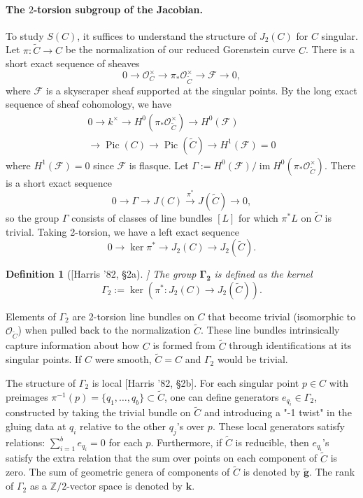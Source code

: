 \documentclass[11pt,a4paper]{article}
\newcommand{\OhC}{\mathcal{O}_C}
\newcommand{\OhCtilde}{\mathcal{O}_{\widetilde{C}}}
\newcommand{\Pic}{\operatorname{Pic}}
\newcommand{\ZZ}{\mathbb{Z}}
\theoremstyle{mytheoremstyle}
\theoremstyle{mydefinitionstyle}
\newtheorem{definition}[theorem]{Definition}
\newcommand{\HarrisThetaCite}[1]{[Harris '82, \S#1]}
\begin{document}
\paragraph{The $2$-torsion subgroup of the Jacobian.}
To study $S(C)$, it suffices to understand the structure of $J_2(C)$ for $C$ singular. Let $\pi: \widetilde{C} \to C$ be the normalization of our reduced Gorenstein curve $C$. There is a short exact sequence of sheaves $$0\to \OhC^\times \to \pi_*\OhCtilde^\times \to \mathcal{F}\to 0,$$
where $\mathcal{F}$ is a skyscraper sheaf supported at the singular points. By the long exact sequence of sheaf cohomology, we have \begin{gather}
    0\to k^\times\to H^0(\pi_*\OhCtilde^\times)\to H^0(\mathcal{F}) \\
    \to \Pic(C) \to \Pic(\widetilde{C})\to H^1(\mathcal{F}) = 0
\end{gather}
where $H^1(\mathcal{F}) = 0$ since $\mathcal{F}$ is flasque. Let $\Gamma:=H^0(\mathcal{F})/\operatorname{im}H^0(\pi_*\OhCtilde^\times)$. There is a short exact sequence $$0\to \Gamma \to J(C)\xrightarrow{\pi^*} J(\widetilde{C})\to 0,$$
so the group $\Gamma$ consists of classes of line bundles $[L]$ for which $\pi^*L $ on $\widetilde{C}$ is trivial. Taking 2-torsion, we have a left exact sequence $$0\to \ker \pi^*\to J_2(C)\to J_2(\widetilde{C}).$$
\begin{definition}[\HarrisThetaCite{2a}]
The group $\mathbf{\Gamma_2}$ is defined as the kernel
\[ \Gamma_2 := \ker \left( \pi^*: J_2(C) \to J_2(\widetilde{C}) \right). \]
\end{definition}
Elements of $\Gamma_2$ are 2-torsion line bundles on $C$ that become trivial (isomorphic to $\OhCtilde$) when pulled back to the normalization $\widetilde{C}$. These line bundles intrinsically capture information about how $C$ is formed from $\widetilde{C}$ through identifications at its singular points. If $C$ were smooth, $\widetilde{C}=C$ and $\Gamma_2$ would be trivial.

The structure of $\Gamma_2$ is local \HarrisThetaCite{2b}. For each singular point $p \in C$ with preimages $\pi^{-1}(p) = \{q_1, \dots, q_b\} \subset \widetilde{C}$, one can define generators $e_{q_i} \in \Gamma_2$, constructed by taking the trivial bundle on $\widetilde{C}$ and introducing a "-1 twist" in the gluing data at $q_i$ relative to the other $q_j$'s over $p$. These local generators satisfy relations: $\sum_{i=1}^b e_{q_i} = 0$ for each $p$. Furthermore, if $\widetilde{C}$ is reducible, then $e_{q_i}$'s satisfy the extra relation that the sum over points on each component of $\widetilde{C}$ is zero. The sum of geometric genera of components of $\widetilde{C}$ is denoted by $\widetilde{\bm{g}}$. The rank of $\Gamma_2$ as a $\ZZ/2$-vector space is denoted by $\bm{k}$.
\end{document}
